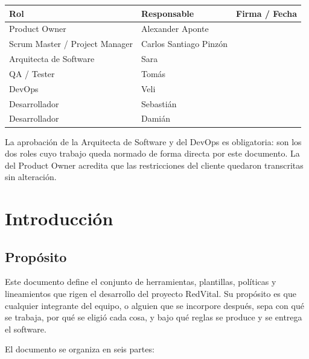 \documentclass[11pt,a4paper]{article}
\begin{document}
\begin{longtable}{L{4.2cm} L{4.8cm} L{4.6cm}}
\toprule
\textbf{Rol} & \textbf{Responsable} & \textbf{Firma / Fecha} \\
\midrule
\endhead
\bottomrule
\endlastfoot
Product Owner & Alexander Aponte & \\
Scrum Master / Project Manager & Carlos Santiago Pinzón & \\
Arquitecta de Software & Sara & \\
QA / Tester & Tomás & \\
DevOps & Veli & \\
Desarrollador & Sebastián & \\
Desarrollador & Damián & \\
\end{longtable}

\vspace{0.2cm}
{\small La aprobación de la Arquitecta de Software y del DevOps es obligatoria: son los dos roles cuyo trabajo queda normado de forma directa por este documento. La del Product Owner acredita que las restricciones del cliente quedaron transcritas sin alteración.}

\newpage

\tableofcontents
\newpage
\listoffigures
\vspace{0.6cm}
\listoftables
\newpage

\section{Introducción}

\subsection{Propósito}

Este documento define el conjunto de herramientas, plantillas, políticas y lineamientos que rigen el desarrollo del proyecto RedVital. Su propósito es que cualquier integrante del equipo, o alguien que se incorpore después, sepa con qué se trabaja, por qué se eligió cada cosa, y bajo qué reglas se produce y se entrega el software.

El documento se organiza en seis partes:
\end{document}
